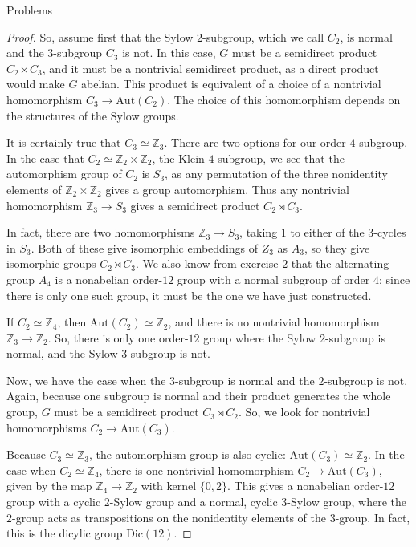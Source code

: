 \documentclass[12pt]{article}
\newcommand{\Z}{\mathbb{Z}}
\theoremstyle{definition}
\newenvironment{problem}[2][Problem]{\begin{trivlist}
\item[\hskip \labelsep {\bfseries #1}\hskip \labelsep {\bfseries #2.}]}{\end{trivlist}}
\begin{document}
\begin{section}{Problems}
\begin{problem}{16}
\begin{proof}
		\par So, assume first that the Sylow $2$-subgroup, which we call $C_2$, is normal and the $3$-subgroup $C_3$ is not. In this case, $G$ must be a semidirect product $C_2 \rtimes C_3$, and it must be a nontrivial semidirect product, as a direct product would make $G$ abelian. This product is equivalent of a choice of a nontrivial homomorphism $C_3 \to \text{Aut}(C_2)$. The choice of this homomorphism depends on the structures of the Sylow groups.
		\par It is certainly true that $C_3 \simeq \Z_3$. There are two options for our order-$4$ subgroup. In the case that $C_2 \simeq \Z_2 \times \Z_2$, the Klein $4$-subgroup, we see that the automorphism group of $C_2$ is $S_3$, as any permutation of the three nonidentity elements of $\Z_2 \times \Z_2$ gives a group automorphism. Thus any nontrivial homomorphism $\Z_3 \to S_3$ gives a semidirect product $C_2 \rtimes C_3$. 
		\par In fact, there are two homomorphisms $\Z_3 \to S_3$, taking $1$ to either of the $3$-cycles in $S_3$. Both of these give isomorphic embeddings of $Z_3$ as $A_3$, so they give isomorphic groups $C_2 \rtimes C_3$. We also know from exercise $2$ that the alternating group $A_4$ is a nonabelian order-$12$ group with a normal subgroup of order $4$; since there is only one such group, it must be the one we have just constructed.
		\par If $C_2 \simeq \Z_4$, then $\text{Aut}(C_2) \simeq \Z_2$, and there is no nontrivial homomorphism $\Z_3 \to \Z_2$. So, there is only one order-$12$ group where the Sylow $2$-subgroup is normal, and the Sylow $3$-subgroup is not.
		\par Now, we have the case when the $3$-subgroup is normal and the $2$-subgroup is not. Again, because one subgroup is normal and their product generates the whole group, $G$ must be a semidirect product $C_3 \rtimes C_2$. So, we look for nontrivial homomorphisms $C_2 \to \text{Aut}(C_3)$.
		\par Because $C_3 \simeq \Z_3$, the automorphism group is also cyclic: $\text{Aut}(C_3) \simeq \Z_2$. In the case when $C_2 \simeq \Z_4$, there is one nontrivial homomorphism $C_2 \to \text{Aut}(C_3)$, given by the map $\Z_4 \to \Z_2$ with kernel $\{0,2\}$. This gives a nonabelian order-$12$ group with a cyclic $2$-Sylow group and a normal, cyclic $3$-Sylow group, where the $2$-group acts as transpositions on the nonidentity elements of the $3$-group. In fact, this is the dicylic group $\text{Dic}(12)$.

\end{proof}
\end{problem}
\end{section}
\end{document}
